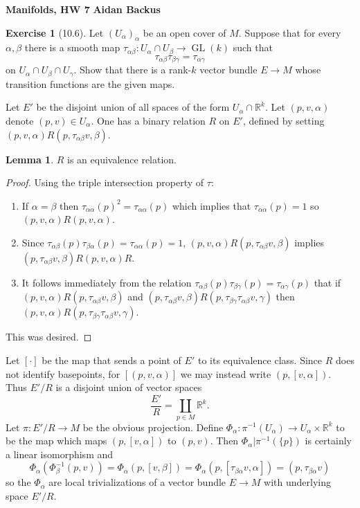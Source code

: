 \documentclass[10pt]{article}
\newcommand{\RR}{\mathbb{R}}
\newcommand{\GL}{\operatorname{GL}}
\theoremstyle{definition}
\newtheorem{exer}{Exercise}
\newtheorem{lemma}{Lemma}[exer]
\begin{document}
\noindent
\large\textbf{Manifolds, HW 7} \hfill \textbf{Aidan Backus} \\


\begin{exer}[10.6]
Let $(U_\alpha)_\alpha$ be an open cover of $M$.
Suppose that for every $\alpha, \beta$ there is a smooth map $\tau_{\alpha\beta}: U_\alpha \cap U_\beta \to \GL(k)$ such that
$$\tau_{\alpha\beta}\tau_{\beta\gamma} = \tau_{\alpha\gamma}$$
on $U_\alpha \cap U_\beta \cap U_\gamma$.
Show that there is a rank-$k$ vector bundle $E \to M$ whose transition functions are the given maps.
\end{exer}

Let $E'$ be the disjoint union of all spaces of the form $U_\alpha \cap \RR^k$.
Let $(p, v, \alpha)$ denote $(p, v) \in U_\alpha$.
One has a binary relation $R$ on $E'$, defined by setting $(p, v, \alpha)R(p, \tau_{\alpha\beta}v, \beta)$.
\begin{lemma}
$R$ is an equivalence relation.
\end{lemma}
\begin{proof}
Using the triple intersection property of $\tau$:
\begin{enumerate}
\item If $\alpha = \beta$ then $\tau_{\alpha\alpha}(p)^2 = \tau_{\alpha\alpha}(p)$ which implies that $\tau_{\alpha\alpha}(p) = 1$ so $(p, v, \alpha)R(p, v, \alpha)$.
\item Since $\tau_{\alpha\beta}(p) \tau_{\beta\alpha}(p) = \tau_{\alpha\alpha}(p) = 1$, $(p, v, \alpha)R(p, \tau_{\alpha\beta}v, \beta)$ implies $(p, \tau_{\alpha\beta}v, \beta)R(p, v, \alpha)R$.
\item It follows immediately from the relation $\tau_{\alpha\beta}(p)\tau_{\beta\gamma}(p) = \tau_{\alpha\gamma}(p)$ that
if $(p, v, \alpha)R(p, \tau_{\alpha\beta}v, \beta)$ and $(p, \tau_{\alpha\beta}v, \beta)R(p, \tau_{\beta\gamma}\tau_{\alpha\beta}v, \gamma)$ then $(p, v, \alpha)R(p, \tau_{\beta\gamma}\tau_{\alpha\beta}v, \gamma)$.
\end{enumerate}
This was desired.
\end{proof}

Let $[\cdot]$ be the map that sends a point of $E'$ to its equivalence class.
Since $R$ does not identify basepoints, for $[(p, v, \alpha)]$ we may instead write $(p, [v, \alpha])$.
Thus $E'/R$ is a disjoint union of vector spaces
$$\frac{E'}{R} = \coprod_{p \in M} \RR^k.$$
Let $\pi: E'/R \to M$ be the obvious projection.
Define $\Phi_\alpha: \pi^{-1}(U_\alpha) \to U_\alpha \times \RR^k$ to be the map which maps $(p, [v, \alpha])$ to $(p, v)$.
Then $\Phi_\alpha|\pi^{-1}(\{p\})$ is certainly a linear isomorphism and
$$\Phi_\alpha(\Phi_\beta^{-1}(p, v)) = \Phi_\alpha(p, [v, \beta]) = \Phi_\alpha(p, [\tau_{\beta\alpha}v, \alpha]) = (p, \tau_{\beta\alpha}v)$$
so the $\Phi_\alpha$ are local trivializations of a vector bundle $E \to M$ with underlying space $E'/R$.
\end{document}
